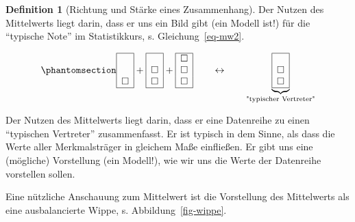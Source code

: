 \documentclass[
  a4paper,
  DIV=11]{scrreprt}
\theoremstyle{definition}
\theoremstyle{definition}
\theoremstyle{definition}
\newtheorem{definition}{Definition}[chapter]
\theoremstyle{remark}
\begin{document}
\begin{definition}[Richtung und Stärke eines
Zusammenhang]
Der Nutzen des Mittelwerts liegt darin, dass er uns ein Bild gibt (ein
Modell ist!) für die ``typische Note'' im Statistikkurs, s.
Gleichung~\ref{eq-mw2}.

\begin{equation}\phantomsection\label{eq-mw2}{\begin{array}{|c|} \hline \\ \\ \square \\ \hline \end{array} + \begin{array}{|c|} \hline \\ \square \\ \square \\ \hline \end{array} + \begin{array}{|c|} \hline \square \\ \square \\ \square \\ \hline \end{array} \qquad \leftrightarrow  \qquad \underbrace{\begin{array}{|c|} \hline \\ \square \\ \square \\ \hline \end{array}}_{\text{"typischer Vertreter"}}}\end{equation}

\begin{tcolorbox}[enhanced jigsaw, leftrule=.75mm, opacitybacktitle=0.6, colback=white, colframe=quarto-callout-important-color-frame, coltitle=black, colbacktitle=quarto-callout-important-color!10!white, opacityback=0, left=2mm, breakable, titlerule=0mm, toptitle=1mm, bottomtitle=1mm, rightrule=.15mm, title=\textcolor{quarto-callout-important-color}{\faExclamation}\hspace{0.5em}{Wichtig}, arc=.35mm, bottomrule=.15mm, toprule=.15mm]

Der Nutzen des Mittelwerts liegt darin, dass er eine Datenreihe zu einen
``typischen Vertreter'' zusammenfasst. Er ist typisch in dem Sinne, als
dass die Werte aller Merkmalsträger in gleichem Maße einfließen. Er gibt
uns eine (mögliche) Vorstellung (ein Modell!), wie wir uns die Werte der
Datenreihe vorstellen sollen.

\end{tcolorbox}

Eine nützliche Anschauung zum Mittelwert ist die Vorstellung des
Mittelwerts als eine ausbalancierte Wippe, s. Abbildung~\ref{fig-wippe}.


\end{definition}
\end{document}
